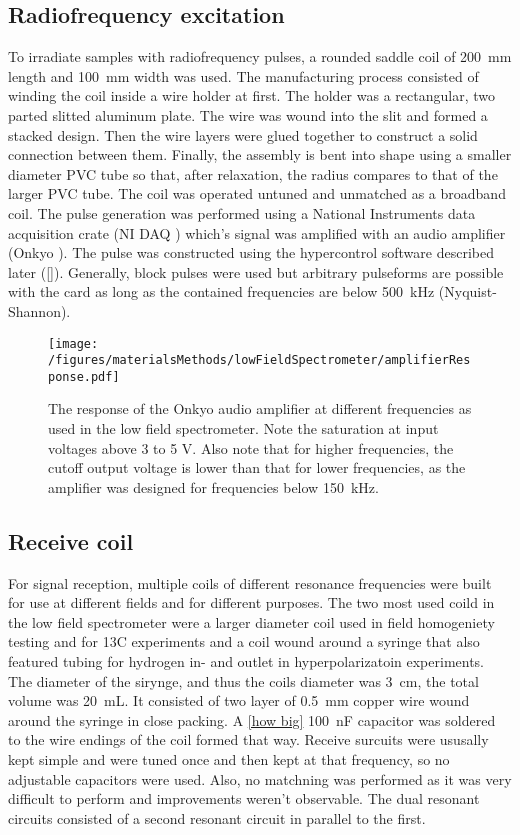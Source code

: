         \subsection{Radiofrequency excitation}
        \label{section:matMeth:rfPulses}
            To irradiate samples with radiofrequency pulses, a rounded saddle coil of \SI{200}{\mm} length and \SI{100}{\mm} width was used. The manufacturing process consisted of winding the coil inside a wire holder at first. The holder was a rectangular, two parted slitted aluminum plate. The wire was wound into the slit and formed a stacked design. Then the wire layers were glued together to construct a solid connection between them.  Finally, the assembly is bent into shape using a smaller diameter PVC tube so that, after relaxation, the radius compares to that of the larger PVC tube. The coil was operated untuned and unmatched as a broadband coil. The pulse generation was performed using a National Instruments data acquisition crate (NI DAQ ) which's signal was amplified with an audio amplifier (Onkyo ).
            The pulse was constructed using the hypercontrol software described later (\ref{}). Generally, block pulses were used but arbitrary pulseforms are possible with the card as long as the contained frequencies are below \SI{500}{\kilo\hertz} (Nyquist-Shannon). 
            \begin{figure}
                \centering
                \texttt{[image: /figures/materialsMethods/lowFieldSpectrometer/amplifierResponse.pdf]}
                \caption[Amplifier response]{The response of the Onkyo audio amplifier at different frequencies as used in the low field spectrometer. Note the saturation at input voltages above 3 to 5 \si{\volt}. Also note that for higher frequencies, the cutoff output voltage is lower than that for lower frequencies, as the amplifier was designed for frequencies below \SI{150}{\kilo\hertz}. }
            \end{figure}
        \subsection{Receive coil}
        \label{section:matMeth:receiveCoil}
        For signal reception, multiple coils of different resonance frequencies were built for use at different fields and for different purposes. The two most used coild in the low field spectrometer were a larger diameter coil used in field homogeniety testing and for 13C experiments and a coil wound around a syringe that also featured tubing for hydrogen in- and outlet in hyperpolarizatoin experiments. The diameter of the sirynge, and thus the coils diameter was \SI{3}{\cm}, the total volume was \SI{20}{\milli\liter}. It consisted of two layer of \SI{0.5}{\milli\meter} copper wire wound around the syringe in close packing. A \ref{how big} \SI{100}{\nano\farad} capacitor was soldered to the wire endings of the coil formed that way. 
        Receive surcuits were ususally kept simple and were tuned once and then kept at that frequency, so no adjustable capacitors were used. Also, no matchning was performed as it was very difficult to perform and improvements weren't observable. The dual resonant circuits consisted of a second resonant circuit in parallel to the first.

